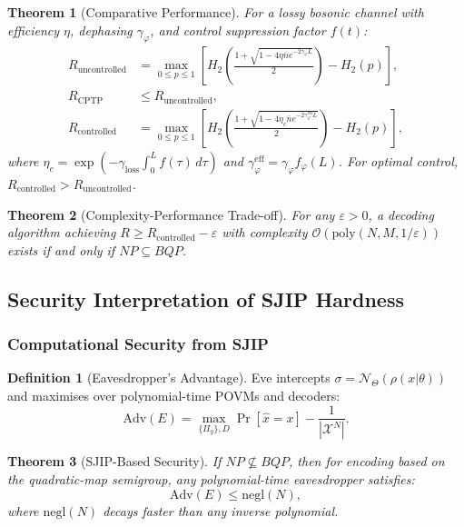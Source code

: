 \documentclass[journal,twocolumn]{IEEEtran}
\theoremstyle{definition}
\newtheorem{definition}{Definition}[section]
\theoremstyle{plain}
\newtheorem{theorem}{Theorem}[section]
\begin{document}
\begin{theorem}[Comparative Performance]
For a lossy bosonic channel with efficiency $\eta$, dephasing
$\gamma_\varphi$, and control suppression factor $f(t)$:
\begin{align}
  R_{\mathrm{uncontrolled}} &= \max_{0\le p\le1}\!\left[
    H_2\!\left(\tfrac{1+\sqrt{1-4\eta\bar{n}e^{-2\gamma_\varphi L}}}{2}\right)
    -H_2(p)\right],\nonumber\\
  R_{\mathrm{CPTP}} &\le R_{\mathrm{uncontrolled}},\nonumber\\
  R_{\mathrm{controlled}} &= \max_{0\le p\le1}\!\left[
    H_2\!\left(\tfrac{1+\sqrt{1-4\eta_c\bar{n}e^{-2\gamma_\varphi^{\mathrm{eff}}L}}}{2}\right)
    -H_2(p)\right],
\end{align}
where
$\eta_c=\exp(-\gamma_{\mathrm{loss}}\int_0^L f(\tau)\,d\tau)$ and
$\gamma_\varphi^{\mathrm{eff}}=\gamma_\varphi f_\varphi(L)$. For
optimal control, $R_{\mathrm{controlled}}>R_{\mathrm{uncontrolled}}$.
\end{theorem}

\begin{theorem}[Complexity-Performance Trade-off]
For any $\varepsilon>0$, a decoding algorithm achieving
$R\ge R_{\mathrm{controlled}}-\varepsilon$ with complexity
$\mathcal{O}(\mathrm{poly}(N,M,1/\varepsilon))$ exists if and only if
$NP\subseteq BQP$.
\end{theorem}

\subsection{Security Interpretation of SJIP Hardness}

\subsubsection{Computational Security from SJIP}

\begin{definition}[Eavesdropper's Advantage]
Eve intercepts $\sigma=\mathcal{N}_\Theta(\rho(x|\theta))$ and
maximises over polynomial-time POVMs and decoders:
\begin{equation}
  \mathrm{Adv}(E)=\max_{\{\Pi_y\},D}\Pr[\hat{x}=x]-\frac{1}{|\mathcal{X}^N|}.
\end{equation}
\end{definition}

\begin{theorem}[SJIP-Based Security]
If $NP\not\subseteq BQP$, then for encoding based on the
quadratic-map semigroup, any polynomial-time eavesdropper satisfies:
\begin{equation}
  \mathrm{Adv}(E)\le\mathrm{negl}(N),
\end{equation}
where $\mathrm{negl}(N)$ decays faster than any inverse polynomial.
\end{theorem}
\end{document}
